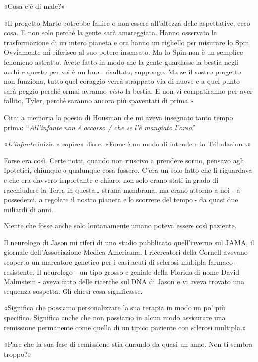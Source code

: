 «Cosa c'è di male?»

«Il progetto Marte potrebbe fallire o non essere all'altezza delle
aspettative, ecco cosa. E non solo perché la gente sarà amareggiata.
Hanno osservato la trasformazione di un intero pianeta e ora hanno un
righello per misurare lo Spin. Ovviamente mi riferisco al suo potere
insensato. Ma lo Spin non è un semplice fenomeno astratto. Avete fatto
in modo che la gente guardasse la bestia negli occhi e questo per voi è
un buon risultato, suppongo. Ma se il vostro progetto non funziona,
tutto quel coraggio verrà strappato via di nuovo e a quel punto sarà
peggio perché ormai avranno \emph{visto} la bestia. E non vi
compatiranno per aver fallito, Tyler, perché saranno ancora più
spaventati di prima.»

Citai a memoria la poesia di Housman che mi aveva insegnato tanto tempo
prima: ``\emph{All'infante non è occorso / che se l'è mangiato
	l'orso}.''

«\emph{L'infante} inizia a capire» disse. «Forse è un modo di intendere
la Tribolazione.»

Forse era così. Certe notti, quando non riuscivo a prendere sonno,
pensavo agli Ipotetici, chiunque o qualunque cosa fossero. C'era un solo
fatto che li riguardava e che era davvero importante e chiaro: non solo
erano stati in grado di racchiudere la Terra in questa\ldots{} strana
membrana, ma erano attorno a noi - a possederci, a regolare il nostro
pianeta e lo scorrere del tempo - da quasi due miliardi di anni.

Niente che fosse anche solo lontanamente umano poteva essere così
paziente.

\separatorefiori

Il neurologo di Jason mi riferì di uno studio pubblicato quell'inverno
sul JAMA, il giornale dell'Associazione Medica Americana. I ricercatori
della Cornell avevano scoperto un marcatore genetico per i casi acuti di
sclerosi multipla farmaco-resistente. Il neurologo - un tipo grosso e
geniale della Florida di nome David Malmstein - aveva fatto delle
ricerche sul DNA di Jason e vi aveva trovato una sequenza sospetta. Gli
chiesi cosa significasse.

«Significa che possiamo personalizzare la sua terapia in modo un po' più
specifico. Significa anche che non possiamo in alcun modo assicurare una
remissione permanente come quella di un tipico paziente con sclerosi
multipla.»

«Pare che la sua fase di remissione stia durando da quasi un anno. Non
ti sembra troppo?»

